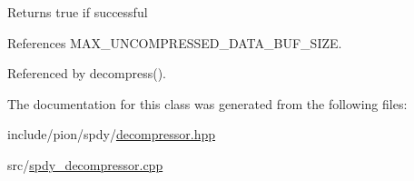 \begin{DoxyReturn}{Returns}
true if successful 
\end{DoxyReturn}


References M\-A\-X\-\_\-\-U\-N\-C\-O\-M\-P\-R\-E\-S\-S\-E\-D\-\_\-\-D\-A\-T\-A\-\_\-\-B\-U\-F\-\_\-\-S\-I\-Z\-E.



Referenced by decompress().



The documentation for this class was generated from the following files\-:\begin{DoxyCompactItemize}
\item 
include/pion/spdy/\hyperlink{decompressor_8hpp}{decompressor.\-hpp}\item 
src/\hyperlink{spdy__decompressor_8cpp}{spdy\-\_\-decompressor.\-cpp}\end{DoxyCompactItemize}
